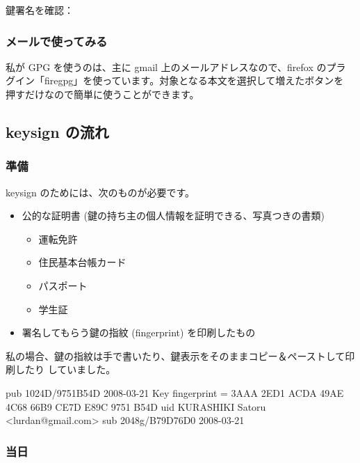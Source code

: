 \documentclass[mingoth,a4paper]{jsarticle}
\begin{document}
鍵署名を確認：

\subsubsection{メールで使ってみる}

私が GPG を使うのは、主に gmail 上のメールアドレスなので、firefox のプラ
グイン「firegpg」を使っています。対象となる本文を選択して増えたボタンを
押すだけなので簡単に使うことができます。

\subsection{keysign の流れ}

\subsubsection{準備}

keysign のためには、次のものが必要です。

\begin{itemize}
 \item 公的な証明書 (鍵の持ち主の個人情報を証明できる、写真つきの書類)
       \begin{itemize}
        \item 運転免許
        \item 住民基本台帳カード
        \item パスポート
        \item 学生証
       \end{itemize}
 \item 署名してもらう鍵の指紋 (fingerprint) を印刷したもの
\end{itemize}

私の場合、鍵の指紋は手で書いたり、鍵表示をそのままコピー＆ペーストして印刷したり
していました。

\begin{commandline}
pub   1024D/9751B54D 2008-03-21
      Key fingerprint = 3AAA 2ED1 ACDA 49AE 4C68  66B9 CE7D E89C 9751 B54D
uid                  KURASHIKI Satoru <lurdan@gmail.com>
sub   2048g/B79D76D0 2008-03-21
\end{commandline}

\subsubsection{当日}
\end{document}
